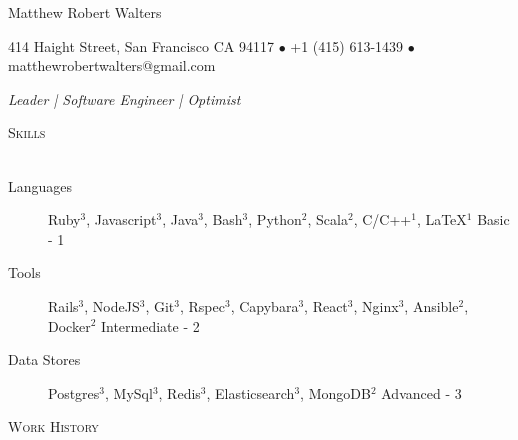 \documentclass{article}
\newcommand{\lineunder}{\vspace*{-8pt} \\ \hspace*{-18pt} \hrulefill \\}
\newcommand{\header}[1]{{\hspace*{-15pt}\vspace*{6pt} \textsc{#1}} \vspace*{-6pt} \lineunder}
\begin{document}
\small
\smallskip
\vspace*{-44pt}


\begin{center}
 
\huge Matthew Robert Walters 
\linebreak
\normalsize

{414 Haight Street, San Francisco CA 94117 $\bullet$ +1 (415) 613-1439 $\bullet$ matthewrobertwalters@gmail.com} \newline


 \textit{Leader | Software Engineer | Optimist}
\end{center}

\small

\header{Skills}

\begin{description}

\item[Languages] Ruby$^3$, Javascript$^3$, Java$^3$, Bash$^3$, Python$^2$, Scala$^2$, C/C++$^1$, \LaTeX$^1$             \hfill Basic - 1

\item[Tools] Rails$^3$, NodeJS$^3$, Git$^3$, Rspec$^3$, Capybara$^3$, React$^3$, Nginx$^3$, Ansible$^2$, Docker$^2$    \hfill Intermediate - 2	
			                                            
\item[Data Stores] Postgres$^3$, MySql$^3$, Redis$^3$, Elasticsearch$^3$, MongoDB$^2$                                                       \hfill Advanced - 3

\end{description}

\header{Work History}
\end{document}
